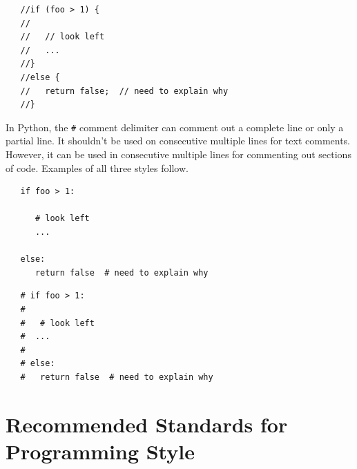 \documentclass{CSSRforAfrica}
\begin{document}
\begin{appendices}
{\small
\begin{verbatim}
   //if (foo > 1) {
   //
   //   // look left
   //   ...
   //}
   //else {
   //   return false;  // need to explain why
   //}
\end{verbatim}
}

\newpage
\noindent
In Python, the {\small \verb+#+} comment delimiter can comment out a complete line or only a partial line.
It shouldn't be used on consecutive multiple lines for text comments.  However, it can be used
in consecutive multiple lines for commenting out sections of code.  Examples of all three styles
follow.

{\small
\begin{verbatim}
   if foo > 1:

      # look left
      ...
 
   else:
      return false  # need to explain why

\end{verbatim}
}

{\small
\begin{verbatim}
   # if foo > 1:
   #
   #   # look left
   #  ...
   #
   # else:
   #   return false  # need to explain why

\end{verbatim}
}
\newpage 

\section{Recommended Standards for Programming Style }
\label{appendix:programming_style_standards}  




\end{appendices}
\end{document}
